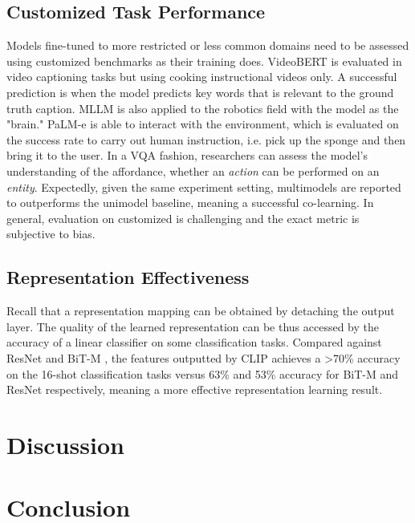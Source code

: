 \documentclass[11pt]{article}
\begin{document}
\subsection{Customized Task Performance}
Models fine-tuned to more restricted or less common domains need to be assessed using customized benchmarks as their training does. VideoBERT \citep{DBLP:conf/iccv/SunMV0S19} is evaluated in video captioning tasks but using cooking instructional videos only. A successful prediction is when the model predicts key words that is relevant to the ground truth caption. MLLM is also applied to the robotics field with the model as the "brain." PaLM-e \citep{DBLP:conf/icml/DriessXSLCIWTVY23} is able to interact with the environment, which is evaluated on the success rate to carry out human instruction, i.e. pick up the sponge and then bring it to the user. In a VQA fashion, researchers can assess the model's understanding of the affordance, whether an \textit{action} can be performed on an \textit{entity}. Expectedly, given the same experiment setting, multimodels are reported to outperforms the unimodel baseline, meaning a successful co-learning. In general, evaluation on customized is challenging and the exact metric is subjective to bias.

\subsection{Representation Effectiveness}
Recall that a representation mapping can be obtained by detaching the output layer. The quality of the learned representation can be thus accessed by the accuracy of a linear classifier on some classification tasks. Compared against ResNet \citep{DBLP:journals/corr/HeZRS15} and BiT-M \citep{DBLP:conf/eccv/KolesnikovBZPYG20}, the features outputted by CLIP \citep{DBLP:conf/iccv/SunMV0S19} achieves a >70\% accuracy on the 16-shot classification tasks versus 63\% and 53\% accuracy for BiT-M and ResNet respectively, meaning a more effective representation learning result. 

\section{Discussion}

\section{Conclusion}



\newpage
\end{document}
